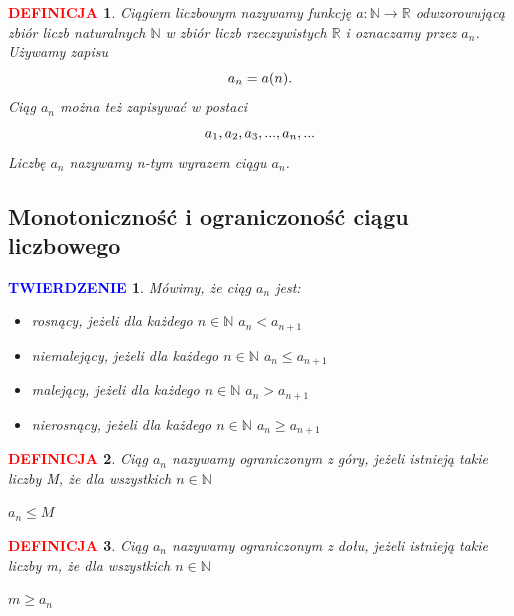 \documentclass[]{article}
\begin{document}
\label{sec:pierwsza}
\newtheorem*{df}{\textcolor{red}{DEFINICJA}}
\newtheorem*{tw}{\textcolor{blue}{TWIERDZENIE}}
	\begin{df}
	
	 \cite{label1} Ciągiem liczbowym nazywamy funkcję $a : \mathbb{N} \to \mathbb{R}$  odwzorowującą zbiór liczb naturalnych $\mathbb{N}$ w zbiór liczb rzeczywistych $\mathbb{R}$ i oznaczamy przez {$a_n$}. Używamy zapisu \\
	 \begin{equation*}
	 	\centering
	 	a_n=a(n).
	 \end{equation*}
	Ciąg ${a_n}$ można też zapisywać w postaci \\
	\begin{equation*}
		\centering
		 a_1, a_2, a_3, ..., a_n, ...
	\end{equation*}
	 Liczbę $a_n$ nazywamy n-tym wyrazem ciągu ${a_n}$.
	\end{df}


		



\subsection{Monotoniczność i ograniczoność ciągu liczbowego}
\label{sec:druga}
\begin{tw}
	Mówimy, że ciąg $a_n$ jest: 
	\begin{itemize}
	\item rosnący, jeżeli dla każdego $n \in \mathbb{N} $ $a_n < a_{n+1}$
	\item niemalejący, jeżeli dla każdego $n \in \mathbb{N}$ $a_n \leq a_{n+1}$ 
	\item malejący, jeżeli dla każdego $n \in \mathbb{N}$ $a_n > a_{n+1}$
	\item nierosnący, jeżeli dla każdego $n\in \mathbb{N}$ $a_n \geq a_{n+1}$
	\end{itemize}
	
	\end{tw}
	\begin{df}
		 Ciąg $a_n$ nazywamy ograniczonym z góry, jeżeli istnieją takie liczby M, że dla wszystkich $n \in \mathbb{N} $
		 \begin{center}
		 	$a_n \leq M$
		 \end{center}
		 \end{df}
	\begin{df}
		Ciąg $a_n$ nazywamy ograniczonym z dołu, jeżeli istnieją takie liczby m, że dla wszystkich $n \in \mathbb{N} $
		 \begin{center}
			$m \geq a_n$
		\end{center}		
	\end{df}
\end{document}
